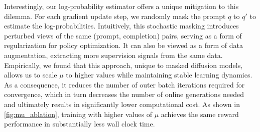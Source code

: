 Interestingly, our log-probability estimator offers a unique mitigation to this dilemma. For each gradient update step, we randomly mask the prompt $q$ to $q'$
to estimate the log-probabilities. Intuitively, this stochastic masking introduces perturbed views of the same (prompt, completion) pairs, serving as a form of regularization for policy optimization. It can also be viewed as a form of data augmentation, extracting more supervision signals from the same data. 
Empirically, we found that this approach, unique to masked diffusion models, allows us to scale $\mu$ to higher values while maintaining stable learning dynamics.  As a consequence, it reduces the number of outer batch iterations required for convergence, which in turn decreases the number of online generations needed and ultimately results in significantly lower computational cost. As shown in \cref{fig:mu_ablation}, training with higher values of $\mu$ achieves the same reward performance in substantially less wall clock time.













